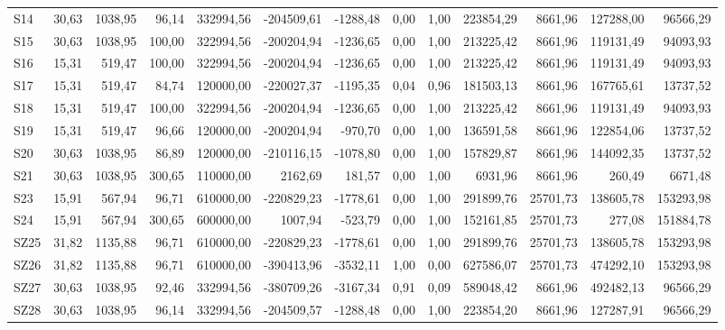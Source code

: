 \begin{longtable}{lrrrrrrrrrrrr}
S14 & 30,63 & 1038,95 & 96,14 & 332994,56 & -204509,61 & -1288,48 & 0,00 & 1,00 & 223854,29 & 8661,96 & 127288,00 & 96566,29 \\
S15 & 30,63 & 1038,95 & 100,00 & 322994,56 & -200204,94 & -1236,65 & 0,00 & 1,00 & 213225,42 & 8661,96 & 119131,49 & 94093,93 \\
S16 & 15,31 & 519,47 & 100,00 & 322994,56 & -200204,94 & -1236,65 & 0,00 & 1,00 & 213225,42 & 8661,96 & 119131,49 & 94093,93 \\
S17 & 15,31 & 519,47 & 84,74 & 120000,00 & -220027,37 & -1195,35 & 0,04 & 0,96 & 181503,13 & 8661,96 & 167765,61 & 13737,52 \\
S18 & 15,31 & 519,47 & 100,00 & 322994,56 & -200204,94 & -1236,65 & 0,00 & 1,00 & 213225,42 & 8661,96 & 119131,49 & 94093,93 \\
S19 & 15,31 & 519,47 & 96,66 & 120000,00 & -200204,94 & -970,70 & 0,00 & 1,00 & 136591,58 & 8661,96 & 122854,06 & 13737,52 \\
S20 & 30,63 & 1038,95 & 86,89 & 120000,00 & -210116,15 & -1078,80 & 0,00 & 1,00 & 157829,87 & 8661,96 & 144092,35 & 13737,52 \\
S21 & 30,63 & 1038,95 & 300,65 & 110000,00 & 2162,69 & 181,57 & 0,00 & 1,00 & 6931,96 & 8661,96 & 260,49 & 6671,48 \\
S23 & 15,91 & 567,94 & 96,71 & 610000,00 & -220829,23 & -1778,61 & 0,00 & 1,00 & 291899,76 & 25701,73 & 138605,78 & 153293,98 \\
S24 & 15,91 & 567,94 & 300,65 & 600000,00 & 1007,94 & -523,79 & 0,00 & 1,00 & 152161,85 & 25701,73 & 277,08 & 151884,78 \\
SZ25 & 31,82 & 1135,88 & 96,71 & 610000,00 & -220829,23 & -1778,61 & 0,00 & 1,00 & 291899,76 & 25701,73 & 138605,78 & 153293,98 \\
SZ26 & 31,82 & 1135,88 & 96,71 & 610000,00 & -390413,96 & -3532,11 & 1,00 & 0,00 & 627586,07 & 25701,73 & 474292,10 & 153293,98 \\
SZ27 & 30,63 & 1038,95 & 92,46 & 332994,56 & -380709,26 & -3167,34 & 0,91 & 0,09 & 589048,42 & 8661,96 & 492482,13 & 96566,29 \\
SZ28 & 30,63 & 1038,95 & 96,14 & 332994,56 & -204509,57 & -1288,48 & 0,00 & 1,00 & 223854,20 & 8661,96 & 127287,91 & 96566,29 \\
\hline
\end{longtable}
